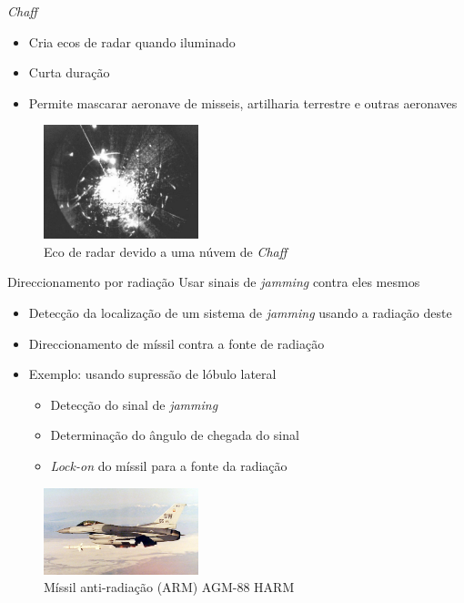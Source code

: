 \documentclass[portuguese,10pt]{beamer}
\begin{document}
\begin{frame}{\textit{Chaff}}
    \begin{itemize}
    \item<1-> Cria ecos de radar quando iluminado
    \item<2-> Curta duração
    \item<3-> Permite mascarar aeronave de misseis, artilharia terrestre e outras aeronaves
    \end{itemize}
    \begin{figure}[ht]
\centering
\includegraphics[width=0.4\textwidth]{graphics/chaff_radarjpg.jpg}
\caption{Eco de radar devido a uma núvem de \textit{Chaff}}
\label{chaff_cloud_echo}
\end{figure}
\end{frame}

\begin{frame}{Direccionamento por radiação}
Usar sinais de \textit{jamming} contra eles mesmos
    \begin{itemize}
    \item<1-> Detecção da localização de um sistema de \textit{jamming} usando a radiação deste
    \item<2-> Direccionamento de míssil contra a fonte de radiação
    \item<3-> Exemplo: usando supressão de lóbulo lateral
    \begin{itemize}
        \item Detecção do sinal de \textit{jamming}
        \item Determinação do ângulo de chegada do sinal
        \item \textit{Lock-on} do míssil para a fonte da radiação
    \end{itemize}
    \end{itemize}
    \begin{figure}[ht]
\centering
\includegraphics[width=0.4\textwidth]{graphics/arm_missile.jpg}
\caption{Míssil anti-radiação (ARM) AGM-88 HARM}
\label{arm_missile}
\end{figure}
\end{frame}
\end{document}
